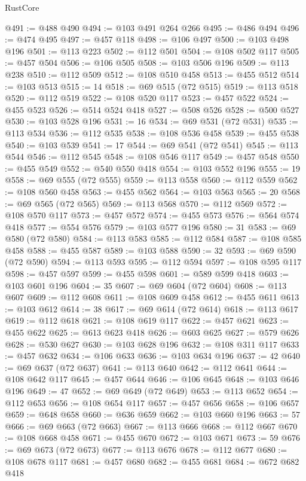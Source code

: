 \begin{lexlean}{RustCore}
\begin{coremodule}
@491 := @488 @490
@494 := @103 @491 @264 @266
@495 := @486 @494
@496 := @474 @495
@497 := @457 @118
@498 := @106 @497
@500 := @103 @498 @196
@501 := @113 @223
@502 := @112 @501
@504 := @108 @502 @117
@505 := @457 @504
@506 := @106 @505
@508 := @103 @506 @196
@509 := @113 @238
@510 := @112 @509
@512 := @108 @510 @458
@513 := @455 @512
@514 := @103 @513
@515 := 14
@518 := @69 @515 (@72 @515)
@519 := @113 @518
@520 := @112 @519
@522 := @108 @520 @117
@523 := @457 @522
@524 := @455 @523
@526 := @514 @524 @418
@527 := @508 @526
@528 := @500 @527
@530 := @103 @528 @196
@531 := 16
@534 := @69 @531 (@72 @531)
@535 := @113 @534
@536 := @112 @535
@538 := @108 @536 @458
@539 := @455 @538
@540 := @103 @539
@541 := 17
@544 := @69 @541 (@72 @541)
@545 := @113 @544
@546 := @112 @545
@548 := @108 @546 @117
@549 := @457 @548
@550 := @455 @549
@552 := @540 @550 @418
@554 := @103 @552 @196
@555 := 19
@558 := @69 @555 (@72 @555)
@559 := @113 @558
@560 := @112 @559
@562 := @108 @560 @458
@563 := @455 @562
@564 := @103 @563
@565 := 20
@568 := @69 @565 (@72 @565)
@569 := @113 @568
@570 := @112 @569
@572 := @108 @570 @117
@573 := @457 @572
@574 := @455 @573
@576 := @564 @574 @418
@577 := @554 @576
@579 := @103 @577 @196
@580 := 31
@583 := @69 @580 (@72 @580)
@584 := @113 @583
@585 := @112 @584
@587 := @108 @585 @458
@588 := @455 @587
@589 := @103 @588
@590 := 32
@593 := @69 @590 (@72 @590)
@594 := @113 @593
@595 := @112 @594
@597 := @108 @595 @117
@598 := @457 @597
@599 := @455 @598
@601 := @589 @599 @418
@603 := @103 @601 @196
@604 := 35
@607 := @69 @604 (@72 @604)
@608 := @113 @607
@609 := @112 @608
@611 := @108 @609 @458
@612 := @455 @611
@613 := @103 @612
@614 := 38
@617 := @69 @614 (@72 @614)
@618 := @113 @617
@619 := @112 @618
@621 := @108 @619 @117
@622 := @457 @621
@623 := @455 @622
@625 := @613 @623 @418
@626 := @603 @625
@627 := @579 @626
@628 := @530 @627
@630 := @103 @628 @196
@632 := @108 @311 @117
@633 := @457 @632
@634 := @106 @633
@636 := @103 @634 @196
@637 := 42
@640 := @69 @637 (@72 @637)
@641 := @113 @640
@642 := @112 @641
@644 := @108 @642 @117
@645 := @457 @644
@646 := @106 @645
@648 := @103 @646 @196
@649 := 47
@652 := @69 @649 (@72 @649)
@653 := @113 @652
@654 := @112 @653
@656 := @108 @654 @117
@657 := @457 @656
@658 := @106 @657
@659 := @648 @658
@660 := @636 @659
@662 := @103 @660 @196
@663 := 57
@666 := @69 @663 (@72 @663)
@667 := @113 @666
@668 := @112 @667
@670 := @108 @668 @458
@671 := @455 @670
@672 := @103 @671
@673 := 59
@676 := @69 @673 (@72 @673)
@677 := @113 @676
@678 := @112 @677
@680 := @108 @678 @117
@681 := @457 @680
@682 := @455 @681
@684 := @672 @682 @418

\end{coremodule}
\end{lexlean}
